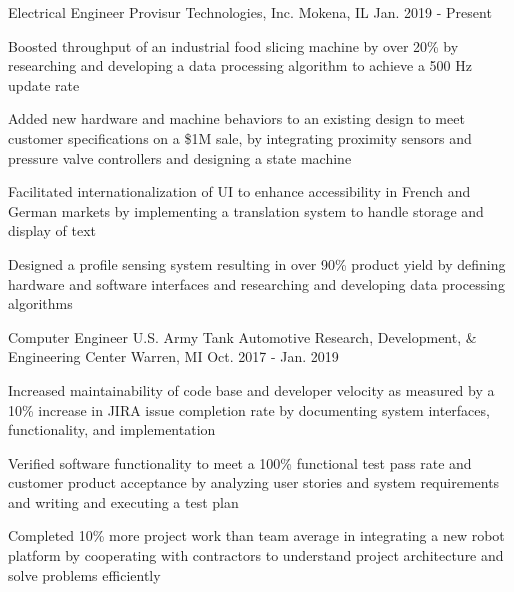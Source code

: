 

\begin{cventries}

  \cventry
    {Electrical Engineer} %
    {Provisur Technologies, Inc.} %
    {Mokena, IL} %
    {Jan. 2019 - Present} %
    {
      \begin{cvitems} %
        \item {Boosted throughput of an industrial food slicing machine by over 20\% by researching and developing a data processing algorithm to achieve a 500 Hz update rate}
        \item {Added new hardware and machine behaviors to an existing design to meet customer specifications on a \$1M sale, by integrating proximity sensors and pressure valve controllers and designing a state machine}
        \item {Facilitated internationalization of UI to enhance accessibility in French and German markets by implementing a translation system to handle storage and display of text}
        \item {Designed a profile sensing system resulting in over 90\% product yield by defining hardware and software interfaces and researching and developing data processing algorithms}
      \end{cvitems}
    }

  \cventry
    {Computer Engineer} %
    {U.S. Army Tank Automotive Research, Development, \& Engineering Center} %
    {Warren, MI} %
    {Oct. 2017 - Jan. 2019} %
    {
      \begin{cvitems} %
        \item {Increased maintainability of code base and developer velocity as measured by a 10\% increase in JIRA issue completion rate by documenting system interfaces, functionality, and implementation}
        \item {Verified software functionality to meet a 100\% functional test pass rate and customer product acceptance by analyzing user stories and system requirements and writing and executing a test plan}
        \item {Completed 10\% more project work than team average in integrating a new robot platform by cooperating with contractors to understand project architecture and solve problems efficiently}
      \end{cvitems}
    }

\end{cventries}
